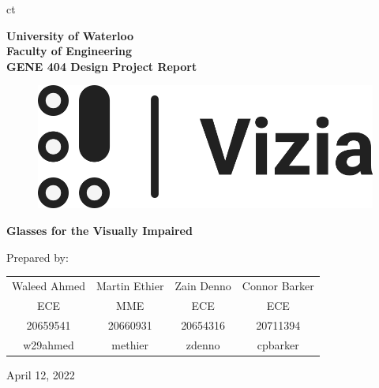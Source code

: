 ct\documentclass[a4paper,11pt]{article}
\begin{document}

\begin{titlingpage}
    \begin{center}
        {\huge\bfseries%
            University of Waterloo \\
        }
        \vspace{1em}
        {\Large\bfseries%
            Faculty of Engineering \\
            \vspace{1em}
            GENE 404 Design Project Report \\
        }
        
        \vspace{10em}
    
        \begin{figure}[H]
            \centering
            \includegraphics[scale=0.45]{img/logo_text_dark.png}
        \end{figure}
        {\Huge\bfseries%
            Glasses for the Visually Impaired \\[0.5em]
        }

        \vspace{10em}
        
        Prepared by: \\
        \vspace{1em}
        \begin{tabular}{cccc}
            Waleed Ahmed & Martin Ethier & Zain Denno & Connor Barker \\
            ECE & MME & ECE & ECE \\
            20659541 & 20660931 & 20654316 & 20711394 \\
            w29ahmed & methier & zdenno & cpbarker
        \end{tabular}
        
        \vspace{9em}
        April 12, 2022
    \end{center}
\end{titlingpage}
\end{document}
